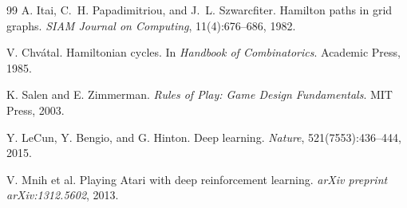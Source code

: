 \documentclass[a4paper]{article}
\begin{document}
\begin{thebibliography}{99}
A. Itai, C.~H. Papadimitriou, and J.~L. Szwarcfiter.
\newblock Hamilton paths in grid graphs.
\newblock \textit{SIAM Journal on Computing}, 11(4):676--686, 1982.

V. Chvátal.
\newblock Hamiltonian cycles.
\newblock In \textit{Handbook of Combinatorics}.
\newblock Academic Press, 1985.

K. Salen and E. Zimmerman.
\newblock \textit{Rules of Play: Game Design Fundamentals}.
\newblock MIT Press, 2003.

Y. LeCun, Y. Bengio, and G. Hinton.
\newblock Deep learning.
\newblock \textit{Nature}, 521(7553):436--444, 2015.

V. Mnih et al.
\newblock Playing {A}tari with deep reinforcement learning.
\newblock \textit{arXiv preprint arXiv:1312.5602}, 2013.

\end{thebibliography}
\end{document}
